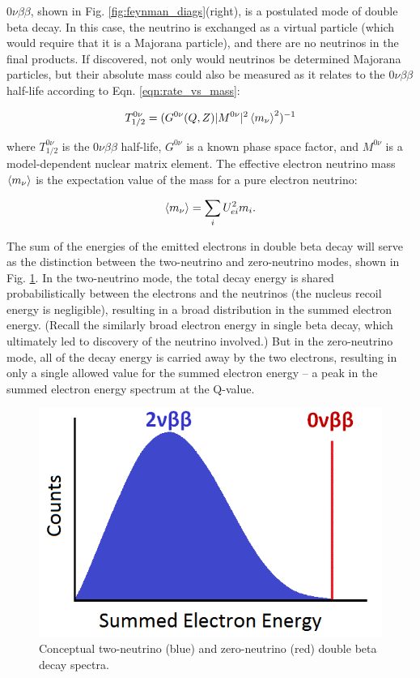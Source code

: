 $0\nu\beta\beta$, shown in Fig. \ref{fig:feynman_diags}(right), is a postulated mode of double beta decay. In this case, the neutrino is exchanged as a virtual particle (which would require that it is a Majorana particle), and there are no neutrinos in the final products. If discovered, not only would neutrinos be determined Majorana particles, but their absolute mass could also be measured as it relates to the $0\nu\beta\beta$ half-life according to Eqn. \ref{eqn:rate_vs_mass}:

\begin{equation}
T_{1/2}^{0\nu} = (G^{0\nu}(Q,Z)|M^{0\nu}|^{2}\braket{m_{\nu}}^{2})^{-1}
\label{eqn:rate_vs_mass}
\end{equation}

\noindent
where $T_{1/2}^{0\nu}$ is the $0\nu\beta\beta$ half-life,  $G^{0\nu}$ is a known phase space factor, and $M^{0\nu}$ is a model-dependent nuclear matrix element. The effective electron neutrino mass $\braket{m_{\nu}}$ is the expectation value of the mass for a pure electron neutrino:

\begin{equation}
\braket{m_{\nu}} = \sum\limits_{i} U_{ei}^{2} m_{i}.
\label{eqn:effectivemass}
\end{equation}

The sum of the energies of the emitted electrons in double beta decay will serve as the distinction between the two-neutrino and zero-neutrino modes, shown in Fig. \ref{fig:spectrum_bb}. In the two-neutrino mode, the total decay energy is shared probabilistically between the electrons and the neutrinos (the nucleus recoil energy is negligible), resulting in a broad distribution in the summed electron energy. (Recall the similarly broad electron energy in single beta decay, which ultimately led to discovery of the neutrino involved.) But in the zero-neutrino mode, all of the decay energy is carried away by the two electrons, resulting in only a single allowed value for the summed electron energy -- a peak in the summed electron energy spectrum at the Q-value. 

\begin{figure}[H]
        \centering
                \includegraphics[width=.7\textwidth]{figures/spectrum_bb.png}
                \caption{Conceptual two-neutrino (blue) and zero-neutrino (red) double beta decay spectra.}
\label{fig:spectrum_bb}
\end{figure}

